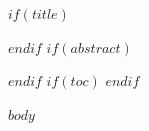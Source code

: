 \documentclass[11pt]{article}
\begin{document}
$if(title)$\maketitle$endif$
$if(abstract)$
\begin{abstract}
$abstract$
\end{abstract}
$endif$
$if(toc)$
{\hypersetup{linkcolor=black}\tableofcontents}
\newpage
$endif$

$body$
\end{document}

